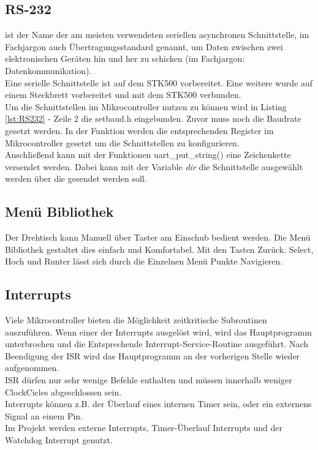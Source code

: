 \subsection{RS-232}
 ist der Name der am meisten verwendeten seriellen asynchronen Schnittstelle, im Fachjargon auch Übertragungsstandard genannt, um Daten zwischen zwei elektronischen Geräten hin und her zu schicken (im Fachjargon: Datenkommunikation).\cite{uC:rs232}\\
Eine serielle Schnittstelle ist auf dem STK500 vorbereitet. Eine weitere wurde auf einem Steckbrett vorbereitet und mit dem STK500 verbunden.\\
Um die Schnittstellen im Mikrocontroller nutzen zu können wird in Listing \ref{lst:RS232} - Zeile 2 die setbaud.h eingebunden. Zuvor muss noch die Baudrate gesetzt werden.
In der Funktion  werden die entsprechenden Register im Mikrocontroller gesetzt um die Schnittstellen zu konfigurieren.\\
Anschließend kann mit der Funktionen uart\_put\_string() eine Zeichenkette versendet werden. Dabei kann mit der Variable \emph{dir} die Schnittstelle ausgewählt werden über die gesendet werden soll.
\lstset{language=C, basicstyle=\footnotesize, showstringspaces=false, tabsize=2}

\subsection{Menü Bibliothek}
Der Drehtisch kann Manuell über Taster am Einschub bedient werden. Die Menü Bibliothek gestaltet dies einfach und Komfortabel. Mit den Tasten Zurück. Select, Hoch und Runter lässt sich durch die Einzelnen Menü Punkte Navigieren. 
\subsection{Interrupts}
\label{sec:Interrupts}
Viele Mikrocontroller bieten die Möglichkeit zeitkritische Subroutinen auszuführen. Wenn einer der Interrupts ausgelöst wird, wird das Hauptprogramm unterbrochen und die Entsprechende Interrupt-Service-Routine ausgeführt. Nach Beendigung der ISR wird das Hauptprogramm an der vorherigen Stelle wieder aufgenommen.\\
ISR dürfen nur sehr wenige Befehle enthalten und müssen innerhalb weniger ClockCicles abgeschlossen sein. \\
Interrupts können z.B. der Überlauf eines internen Timer sein, oder ein externens Signal an einem Pin.\\
Im Projekt werden externe Interrupts, Timer-Überlauf Interrupts und der Watchdog Interrupt genutzt. 

